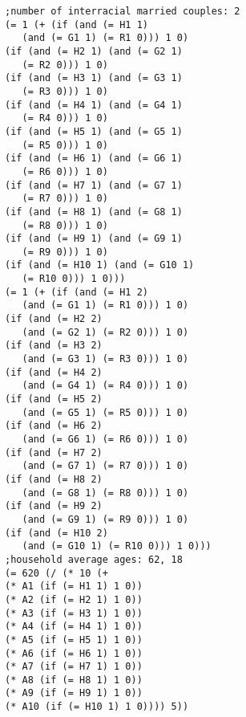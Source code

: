 \documentclass[5p,times,11pt]{elsarticle}
\begin{document}
\begin{verbatim}
;number of interracial married couples: 2
(= 1 (+ (if (and (= H1 1)
   (and (= G1 1) (= R1 0))) 1 0)
(if (and (= H2 1) (and (= G2 1)
   (= R2 0))) 1 0)
(if (and (= H3 1) (and (= G3 1)
   (= R3 0))) 1 0)
(if (and (= H4 1) (and (= G4 1)
   (= R4 0))) 1 0)
(if (and (= H5 1) (and (= G5 1)
   (= R5 0))) 1 0)
(if (and (= H6 1) (and (= G6 1)
   (= R6 0))) 1 0)
(if (and (= H7 1) (and (= G7 1)
   (= R7 0))) 1 0)
(if (and (= H8 1) (and (= G8 1)
   (= R8 0))) 1 0)
(if (and (= H9 1) (and (= G9 1)
   (= R9 0))) 1 0)
(if (and (= H10 1) (and (= G10 1)
   (= R10 0))) 1 0)))
(= 1 (+ (if (and (= H1 2)
   (and (= G1 1) (= R1 0))) 1 0)
(if (and (= H2 2)
   (and (= G2 1) (= R2 0))) 1 0)
(if (and (= H3 2)
   (and (= G3 1) (= R3 0))) 1 0)
(if (and (= H4 2)
   (and (= G4 1) (= R4 0))) 1 0)
(if (and (= H5 2)
   (and (= G5 1) (= R5 0))) 1 0)
(if (and (= H6 2)
   (and (= G6 1) (= R6 0))) 1 0)
(if (and (= H7 2)
   (and (= G7 1) (= R7 0))) 1 0)
(if (and (= H8 2)
   (and (= G8 1) (= R8 0))) 1 0)
(if (and (= H9 2)
   (and (= G9 1) (= R9 0))) 1 0)
(if (and (= H10 2)
   (and (= G10 1) (= R10 0))) 1 0)))
;household average ages: 62, 18
(= 620 (/ (* 10 (+
(* A1 (if (= H1 1) 1 0))
(* A2 (if (= H2 1) 1 0))
(* A3 (if (= H3 1) 1 0))
(* A4 (if (= H4 1) 1 0))
(* A5 (if (= H5 1) 1 0))
(* A6 (if (= H6 1) 1 0))
(* A7 (if (= H7 1) 1 0))
(* A8 (if (= H8 1) 1 0))
(* A9 (if (= H9 1) 1 0))
(* A10 (if (= H10 1) 1 0)))) 5))

\end{verbatim}
\end{document}
